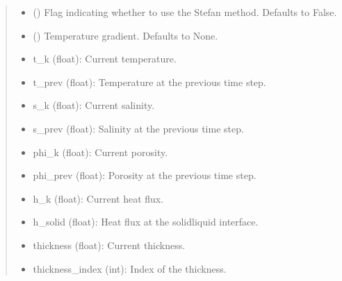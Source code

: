 \documentclass[a4paper,11pt,english,openany]{sphinxmanual}
\begin{document}
\begin{fulllineitems}
\begin{fulllineitems}
\begin{quote}
\begin{description}
\begin{itemize}
\item {} 
\sphinxAtStartPar
{} (\sphinxstyleliteralemphasis{\sphinxupquote{, }}) \textendash{} Flag indicating whether to use the Stefan method. Defaults to False.

\item {} 
\sphinxAtStartPar
{} (\sphinxstyleliteralemphasis{\sphinxupquote{, }}) \textendash{} Temperature gradient. Defaults to None.

\end{itemize}

\sphinxAtStartPar
\begin{description}
\begin{itemize}
\item {} 
\sphinxAtStartPar
t\_k (float): Current temperature.

\item {} 
\sphinxAtStartPar
t\_prev (float): Temperature at the previous time step.

\item {} 
\sphinxAtStartPar
s\_k (float): Current salinity.

\item {} 
\sphinxAtStartPar
s\_prev (float): Salinity at the previous time step.

\item {} 
\sphinxAtStartPar
phi\_k (float): Current porosity.

\item {} 
\sphinxAtStartPar
phi\_prev (float): Porosity at the previous time step.

\item {} 
\sphinxAtStartPar
h\_k (float): Current heat flux.

\item {} 
\sphinxAtStartPar
h\_solid (float): Heat flux at the solid\sphinxhyphen{}liquid interface.

\item {} 
\sphinxAtStartPar
thickness (float): Current thickness.

\item {} 
\sphinxAtStartPar
thickness\_index (int): Index of the thickness.


\end{itemize}
\end{description}
\end{description}
\end{quote}
\end{fulllineitems}
\end{fulllineitems}
\end{document}
